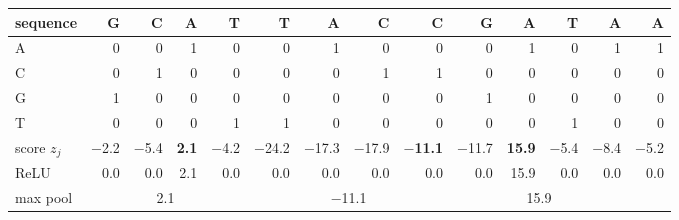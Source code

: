 \begin{tabular}{l*{13}{r}}
\toprule
sequence & G & C & A & T & T & A & C & C & G & A & T & A & A \\
\midrule
A & 0 & 0 & 1 & 0 & 0 & 1 & 0 & 0 & 0 & 1 & 0 & 1 & 1 \\
C & 0 & 1 & 0 & 0 & 0 & 0 & 1 & 1 & 0 & 0 & 0 & 0 & 0 \\
G & 1 & 0 & 0 & 0 & 0 & 0 & 0 & 0 & 1 & 0 & 0 & 0 & 0 \\
T & 0 & 0 & 0 & 1 & 1 & 0 & 0 & 0 & 0 & 0 & 1 & 0 & 0 \\
\midrule
score $z_j$ & $-$2.2 & $-$5.4 & \textbf{2.1} & $-$4.2 & $-$24.2 & $-$17.3 & $-$17.9 & \textbf{$-$11.1} & $-$11.7 & \textbf{15.9} & $-$5.4 & $-$8.4 & $-$5.2 \\
ReLU & 0.0 & 0.0 & 2.1 & 0.0 & 0.0 & 0.0 & 0.0 & 0.0 & 0.0 & 15.9 & 0.0 & 0.0 & 0.0 \\
\cmidrule(lr){2-5}\cmidrule(lr){6-9}\cmidrule(lr){10-13}
max pool & \multicolumn{4}{c}{2.1} & \multicolumn{4}{c}{$-$11.1} & \multicolumn{4}{c}{15.9} & \\
\bottomrule
\end{tabular}
